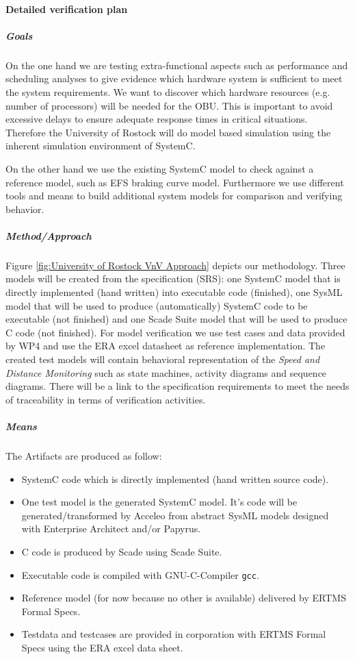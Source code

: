 \paragraph{Detailed verification plan}

\subparagraph{Goals}

On the one hand we are testing extra-functional aspects such as performance and scheduling analyses to give evidence which hardware system is sufficient to meet the system requirements. We want to discover which hardware resources (e.g. number of processors) will be needed for the OBU. This is important to avoid excessive delays to ensure adequate response times in critical situations. Therefore the University of Rostock will do model based simulation using the inherent simulation environment of SystemC.

On the other hand we use the existing SystemC model to check against a reference model, such as EFS braking curve model. Furthermore we use different tools and means to build additional system models for comparison and verifying behavior.

\subparagraph{Method/Approach}

Figure \ref{fig:University of Rostock VnV Approach} depicts our methodology. Three models will be created from the specification (SRS): one SystemC model that is directly implemented (hand written) into executable code (finished), one SysML model that will be used to produce (automatically) SystemC code to be executable (not finished) and one Scade Suite model that will be used to produce C code (not finished). For model verification we use test cases and data provided by WP4 and use the ERA excel datasheet as reference implementation. The created test models will contain behavioral representation of the \emph{Speed and Distance Monitoring} such as state machines, activity diagrams and sequence diagrams. There will be a link to the specification requirements to meet the needs of traceability in terms of verification activities.


\subparagraph{Means}

The Artifacts are produced as follow:
\begin{itemize}
\item SystemC code which is directly implemented (hand written source code).
\item One test model is the generated SystemC model. It's code will be generated/transformed by Acceleo from abstract SysML models designed with Enterprise Architect and/or Papyrus.
\item C code is produced by Scade using Scade Suite.
\item Executable code is compiled with GNU-C-Compiler \texttt{gcc}.
\item Reference model (for now because no other is available) delivered by ERTMS Formal Specs.
\item Testdata and testcases are provided in corporation with ERTMS Formal Specs using the ERA excel data sheet.
\end{itemize}

